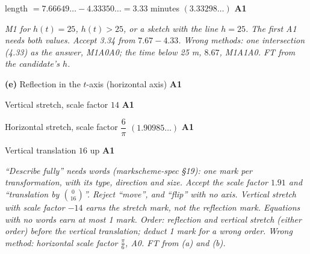 \documentclass[12pt, twoside]{article}
\begin{document}
\begin{enumerate}[itemsep=0.2cm]
length $= 7.66649\ldots - 4.33350\ldots = 3.33$ minutes
\quad $(3.33298\ldots)$ \hfill \textbf{A1}

\emph{M1 for $h(t) = 25$, $h(t) > 25$, or a sketch with the line
$h = 25$. The first A1 needs both values. Accept 3.34 from $7.67 - 4.33$.
Wrong methods: one intersection (4.33) as the answer, M1A0A0; the time
below 25 m, $8.67$, M1A1A0. FT from the candidate's $h$.}

\textbf{(e)} Reflection in the $t$-axis (horizontal axis) \hfill \textbf{A1}

Vertical stretch, scale factor $14$ \hfill \textbf{A1}

Horizontal stretch, scale factor $\dfrac{6}{\pi}$ \quad $(1.90985\ldots)$
\hfill \textbf{A1}

Vertical translation $16$ up \hfill \textbf{A1}

\emph{``Describe fully'' needs words (markscheme-spec \S19): one mark per
transformation, with its type, direction and size. Accept the scale
factor $1.91$ and ``translation by $\binom{0}{16}$''. Reject ``move'', and
``flip'' with no axis. Vertical stretch with scale factor $-14$ earns the
stretch mark, not the reflection mark. Equations with no words earn at
most 1 mark. Order: reflection and vertical stretch (either order) before
the vertical translation; deduct 1 mark for a wrong order. Wrong method:
horizontal scale factor $\frac{\pi}{6}$, A0. FT from (a) and (b).}

\end{enumerate}
\end{document}
